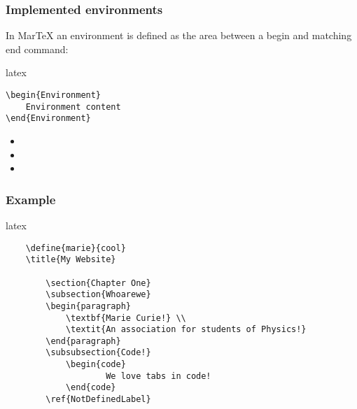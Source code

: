 \subsubsection{Implemented environments}
In MarTeX an environment is defined as the area between a begin and matching end command:

\begin{code}{latex}
\begin{verbatim}
\begin{Environment} 
    Environment content
\end{Environment}
\end{verbatim} 
\end{code}

\begin{itemize}
    \item{}
    \item{}
    \item{}
\end{itemize}

\subsubsection{Example}
\begin{code}{latex} 
\begin{verbatim}
    \define{marie}{cool}
    \title{My Website}
    
        \section{Chapter One}
        \subsection{Whoarewe}
        \begin{paragraph}
            \textbf{Marie Curie!} \\
            \textit{An association for students of Physics!}
        \end{paragraph}
        \subsubsection{Code!}
            \begin{code}
                    We love tabs in code!
            \end{code}       
        \ref{NotDefinedLabel}
     
\end{verbatim} 
\end{code}

